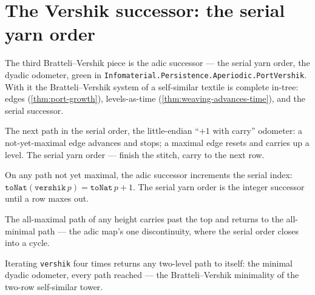 \section{The Vershik successor: the serial yarn order}

The third Bratteli--Vershik piece is the adic successor --- the serial yarn order, the dyadic
odometer, green in \texttt{Infomaterial.Persistence.Aperiodic.PortVershik}. With it the Bratteli--Vershik system of a
self-similar textile is complete in-tree: edges (\cref{thm:port-growth}), levels-as-time
(\cref{thm:weaving-advances-time}), and the serial successor.

\begin{proposition}\label{thm:vershik}\leanok{}
The next path in the serial order, the little-endian ``$+1$ with carry'' odometer: a not-yet-maximal
edge advances and stops; a maximal edge resets and carries up a level. The serial yarn order ---
finish the stitch, carry to the next row.
\end{proposition}

\begin{theorem}\label{thm:vershik-succ}\leanok{}
On any path not yet maximal, the adic successor increments the serial index:
$\texttt{toNat}(\texttt{vershik}\,p) = \texttt{toNat}\,p + 1$. The serial yarn order is the integer
successor until a row maxes out.
\end{theorem}

\begin{theorem}\label{thm:vershik-wrap}\leanok{}
The all-maximal path of any height carries past the top and returns to the all-minimal path --- the
adic map's one discontinuity, where the serial order closes into a cycle.
\end{theorem}

\begin{theorem}\label{thm:vershik-cycle}\leanok{}
Iterating \texttt{vershik} four times returns any two-level path to itself: the minimal dyadic
odometer, every path reached --- the Bratteli--Vershik minimality of the two-row self-similar tower.
\end{theorem}
